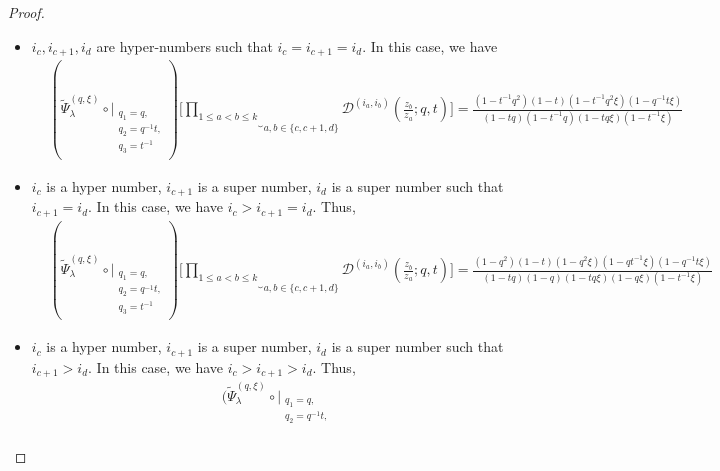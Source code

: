 \documentclass[12pt,reqno,a4paper]{amsart}
\newcommand{\comp}{\circ}
\newcommand{\cals}[1]{\mathcal{#1}}
\numberwithin{equation}{section}
\newcommand{\dualmap}{
\widetilde{\Psi}^{(q,\xi)}_{\lambda}
}
\theoremstyle{definition}
\begin{document}
\begin{proof}
\begin{itemize}
\begin{align}
{{				q_2 = q^{-1}t,\\
				q_3 = t^{-1} \\
			}
		}
		)
		\Bigg[
		\underbrace{	\prod_{1 \leq a < b \leq k}				}_{a,b \in \{c,c+1,d\}}
		\cals{D}^{(i_a,i_b)}\left(
		\frac{z_b}{z_a}
		; q, t
		\right)
		\Bigg]
		= 
		\frac{
			(1 - t^{-1}q^2)(1 - t)(1 - q^2\xi)(1 - q^{-1}t\xi)
		}{
			(1 - tq)(1 - t^{-1}q)(1 - tq\xi)(1 - \xi)
		}
	\end{align}
	\normalsize
	\item $i_c, i_{c+1}, i_d$ are hyper-numbers such that $i_c = i_{c+1} = i_d$. In this case, we have 
	\footnotesize
	\begin{align}
		&(
		\dualmap
		\comp 
		\bigg|_{
			\substack{
				q_1 = q, \\
				q_2 = q^{-1}t,\\
				q_3 = t^{-1} \\
			}
		}
		)
		\Bigg[
		\underbrace{	\prod_{1 \leq a < b \leq k}				}_{a,b \in \{c,c+1,d\}}
		\cals{D}^{(i_a,i_b)}\left(
		\frac{z_b}{z_a}
		; q, t
		\right)
		\Bigg]
		= 
		\frac{
			(1 - t^{-1}q^2)(1 - t)(1 - t^{-1}q^2\xi)(1 - q^{-1}t\xi)
		}{
			(1 - tq)(1 - t^{-1}q)(1 - tq\xi)(1 - t^{-1}\xi)
		}
	\end{align}
	\normalsize
	\item $i_c$ is a hyper number, $i_{c+1}$ is a super number, $i_d$ is a super number such that $i_{c+1} = i_d$.
	In this case, we have $i_c > i_{c+1} = i_d$. Thus, 
	\footnotesize
	\begin{align}
		&(
		\dualmap
		\comp 
		\bigg|_{
			\substack{
				q_1 = q, \\
				q_2 = q^{-1}t,\\
				q_3 = t^{-1} \\
			}
		}
		)
		\Bigg[
		\underbrace{	\prod_{1 \leq a < b \leq k}				}_{a,b \in \{c,c+1,d\}}
		\cals{D}^{(i_a,i_b)}\left(
		\frac{z_b}{z_a}
		; q, t
		\right)
		\Bigg]
		= 
		\frac{
			(1 - q^2)(1 - t)(1 - q^2\xi)(1 - qt^{-1}\xi)(1 - q^{-1}t\xi)
		}{
			(1 - tq)(1 - q)(1 - tq\xi)(1 - q\xi)(1 - t^{-1}\xi)
		}
	\end{align}
	\normalsize
	\item $i_c$ is a hyper number, $i_{c+1}$ is a super number, $i_d$ is a super number such that $i_{c+1} > i_d$. 
	In this case, we have $i_c > i_{c+1} > i_d$. Thus, 
	\footnotesize
	\begin{align}
		&(
		\dualmap
		\comp 
		\bigg|_{
			\substack{
				q_1 = q, \\
				q_2 = q^{-1}t,\\
}}
\end{align}
\end{itemize}
\end{proof}
\end{document}
